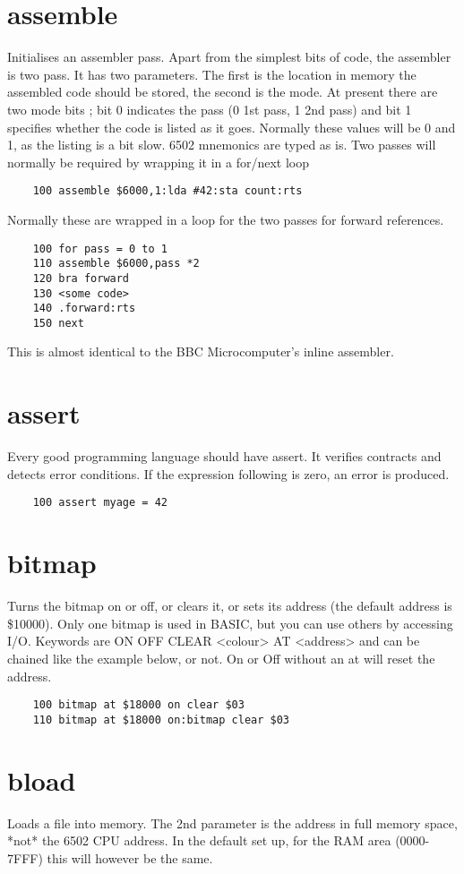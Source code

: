 \section*{assemble}
Initialises an assembler pass. Apart from the simplest bits of code, the assembler is two pass. It has two parameters. The first is the location in memory the assembled code should be stored, the second is the mode. At present there are two mode bits ; bit 0 indicates the pass (0 1st pass, 1 2nd pass) and bit 1 specifies whether the code is listed as it goes. Normally these values will be 0 and 1, as the listing is a bit slow. 6502 mnemonics are typed as is. Two passes will normally be required by wrapping it in a for/next loop
\example{}
\begin{verbatim}
	100 assemble $6000,1:lda #42:sta count:rts
\end{verbatim}
Normally these are wrapped in a loop for the two passes for forward references.
\example{}
\begin{verbatim}
	100 for pass = 0 to 1
	110 assemble $6000,pass *2
	120 bra forward
	130 <some code>
	140 .forward:rts
	150 next
\end{verbatim}
This is almost identical to the BBC Microcomputer’s inline assembler.

\section*{assert}
Every good programming language should have assert. It verifies contracts and detects error conditions. If the expression following is zero, an error is produced.
\example{}
\begin{verbatim}
	100 assert myage = 42
\end{verbatim}

\section*{bitmap}
Turns the bitmap on or off, or clears it, or sets its address (the default address is \$10000). Only one bitmap is used in BASIC, but you can use others by accessing I/O. Keywords are ON OFF CLEAR <colour> AT <address> and can be chained like the example below, or not. On or Off without an at will reset the address.
\example{}
\begin{verbatim}
	100 bitmap at $18000 on clear $03
	110 bitmap at $18000 on:bitmap clear $03
\end{verbatim}

\section*{bload}
Loads a file into memory. The 2nd parameter is the address in full memory space, *not* the 6502 CPU address. In the default set up, for the RAM area (0000-7FFF) this will however be the same.

